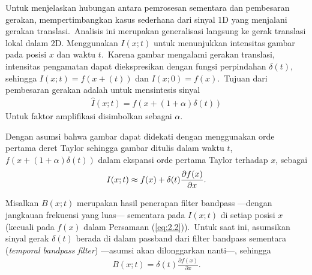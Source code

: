 Untuk menjelaskan hubungan antara pemrosesan sementara dan pembesaran gerakan, \citet{Wu2012} mempertimbangkan kasus sederhana dari sinyal 1D yang menjalani gerakan translasi.~Analisis ini merupakan generalisasi langsung ke gerak translasi lokal dalam 2D.
Menggunakan \(I(x; t)\) untuk menunjukkan intensitas gambar pada posisi \(x\) dan waktu \(t\).~Karena gambar mengalami gerakan translasi, intensitas pengamatan dapat diekspresikan dengan fungsi perpindahan \(\delta (t)\), sehingga \({I(x; t)  =  f(x  +  (t))}\) dan \({I(x; 0)  =  f(x)}\).~Tujuan dari pembesaran gerakan adalah untuk mensintesis sinyal
\begin{equation}\label{eq:2.1}
\begin{aligned}
\hat {I}(x;t) = f(x + (1 + \alpha )\delta (t))
\end{aligned}
\end{equation}
Untuk faktor amplifikasi disimbolkan sebagai \(\alpha \).\newline

Dengan asumsi bahwa gambar dapat didekati dengan menggunakan orde pertama deret Taylor sehingga gambar ditulis dalam waktu \(t\), \(f(x + (1 + \alpha )\delta (t))\) dalam ekspansi orde pertama Taylor terhadap \(x\), sebagai
\begin{equation} \label{eq:2.2}
\begin{aligned}
I(x; t) \approx f(x) + \delta {\rm{(}}t{\rm{)}}\frac{{\partial f(x)}}{{\partial x}}.
\end{aligned}
\end{equation}

Misalkan \(B(x; t)\) merupakan hasil penerapan filter bandpass ---dengan jangkauan frekuensi yang luas--- sementara pada \(I(x; t)\) di setiap posisi \(x\) (kecuali pada \(f(x)\) dalam Persamaan (\ref{eq:2.2})).~Untuk saat ini, asumsikan sinyal gerak \(\delta (t)\) berada di dalam passband dari filter bandpass sementara (\textit{temporal bandpass filter}) ---asumsi akan dilonggarkan nanti---, sehingga
\begin{equation} \label{eq:2.3}
\begin{aligned}
B(x; t)  = \delta {(t)}\frac{{\partial f(x)}}{{\partial x}}.
\end{aligned}
\end{equation}


